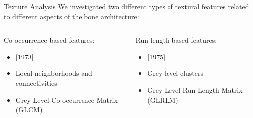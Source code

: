 \documentclass[10pt,aspectratio=169]{beamer}
\begin{document}
\begin{frame}[fragile]{Texture Analysis}
  \noindent We investigated two different types of textural features related to different aspects of the bone architecture:
  \vspace{0.1cm}
  \begin{columns}
  \centering
  \begin{exampleblock}{Co-occurrence based-features:}
    \begin{itemize} \itemsep0.8em
      \item \cite{Haralick1973} [1973]
      \item Local neighborhoods and connectivities
      \item Grey Level Co-occurrence Matrix (GLCM)
    \end{itemize}
  \end{exampleblock}
  \centering
  \begin{exampleblock}{Run-length based-features:}
    \begin{itemize} \itemsep0.8em
      \item \cite{Galloway1975} [1975]
      \item Grey-level clusters
      \item Grey Level Run-Length Matrix (GLRLM)
    \end{itemize}
  \end{exampleblock}
  \end{columns}
\end{frame}
\end{document}
